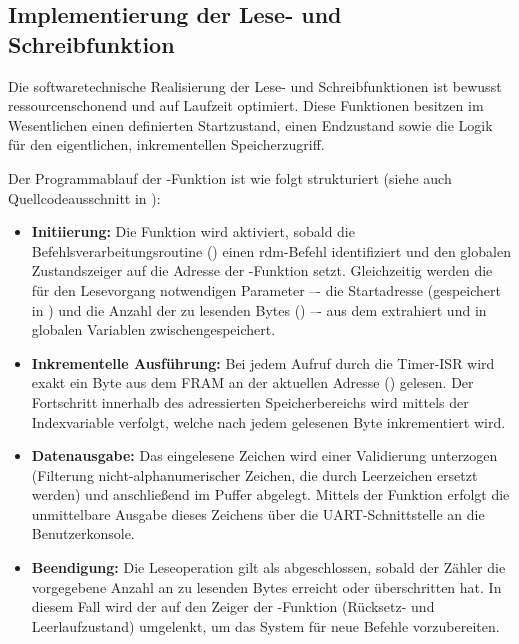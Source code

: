 \subsection{Implementierung der Lese- und Schreibfunktion}
\label{Implementierung_Lesen_Schreiben}

Die softwaretechnische Realisierung der Lese- und Schreibfunktionen ist bewusst ressourcenschonend und auf Laufzeit optimiert. Diese Funktionen besitzen im Wesentlichen einen definierten Startzustand, einen Endzustand sowie die Logik f\"ur den eigentlichen, inkrementellen Speicherzugriff.

Der Programmablauf der -Funktion ist wie folgt strukturiert (siehe auch Quellcodeausschnitt in ):
\begin{itemize}
	\item \textbf{Initiierung:} Die Funktion wird aktiviert, sobald die Befehlsverarbeitungsroutine () einen \grqq rdm\grqq-Befehl identifiziert und den globalen Zustandszeiger  auf die Adresse der -Funktion setzt. Gleichzeitig werden die f\"ur den Lesevorgang notwendigen Parameter –- die Startadresse (gespeichert in ) und die Anzahl der zu lesenden Bytes () –- aus dem  extrahiert und in globalen Variablen zwischengespeichert.
	
	\item \textbf{Inkrementelle Ausf\"uhrung:} Bei jedem Aufruf durch die Timer-ISR wird exakt ein Byte aus dem FRAM an der aktuellen Adresse () gelesen. Der Fortschritt innerhalb des adressierten Speicherbereichs wird mittels der Indexvariable  verfolgt, welche nach jedem gelesenen Byte inkrementiert wird.
	
	\item \textbf{Datenausgabe:} Das eingelesene Zeichen wird einer Validierung unterzogen (Filterung nicht-alphanumerischer Zeichen, die durch Leerzeichen ersetzt werden) und anschlie{\ss}end im Puffer  abgelegt. Mittels der Funktion  erfolgt die unmittelbare Ausgabe dieses Zeichens \"uber die UART-Schnittstelle an die Benutzerkonsole.
	
	\item \textbf{Beendigung:} Die Leseoperation gilt als abgeschlossen, sobald der Z\"ahler  die vorgegebene Anzahl an zu lesenden Bytes erreicht oder \"uberschritten hat. In diesem Fall wird der  auf den Zeiger der -Funktion (R\"ucksetz- und Leerlaufzustand) umgelenkt, um das System f\"ur neue Befehle vorzubereiten.
\end{itemize}


